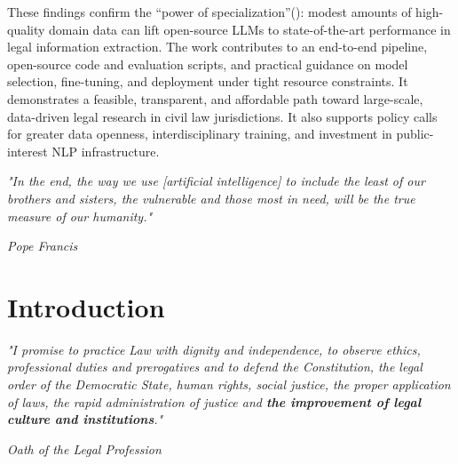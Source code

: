 \documentclass[
  12pt,
]{article}
\begin{document}
These findings confirm the ``power of
specialization''(): modest amounts of high-quality domain data can lift
open-source LLMs to state-of-the-art performance in legal information
extraction. The work contributes to an end-to-end pipeline, open-source
code and evaluation scripts, and practical guidance on model selection,
fine-tuning, and deployment under tight resource constraints. It
demonstrates a feasible, transparent, and affordable path toward
large-scale, data-driven legal research in civil law jurisdictions. It
also supports policy calls for greater data openness, interdisciplinary
training, and investment in public-interest NLP infrastructure.

\newpage{}

\tableofcontents
\newpage
\listoffigures
\newpage
\listoftables
\thispagestyle{empty}
\newpage
\thispagestyle{empty}
\vspace*{\fill}
\begin{flushright}
\begin{minipage}{0.45\textwidth}
\singlespacing
\justifying
\textit{\fontsize{10}{12}\selectfont
"In the end, the way we use [artificial intelligence] to include the least of our brothers and sisters, the vulnerable and those most in need, will be the true measure of our humanity."
}

\vspace{1ex}
\begin{flushright}
\textit{Pope Francis\footnotemark}
\end{flushright}
\end{minipage}
\end{flushright}

\vspace*{0pt}
\newpage

\section{Introduction}\label{sec-introduction}

\vspace*{\fill}
\noindent\hfill
\begin{minipage}{0.50\textwidth}
\singlespacing
\justifying
\textit{\fontsize{10}{12}\selectfont"I promise to practice Law with dignity and independence, to observe ethics, professional duties and prerogatives and to defend the Constitution, the legal order of the Democratic State, human rights, social justice, the proper application of laws, the rapid administration of justice and \textbf{the improvement of legal culture and institutions}."
}
\vspace{1ex}
\begin{flushright}
\textit{Oath of the Legal Profession\footnotemark}
\end{flushright}
\end{minipage}
\end{document}
